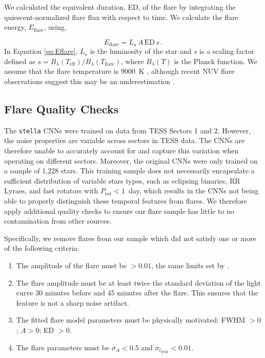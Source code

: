 \documentclass[twocolumn, linenumbers]{aastex631}
\begin{document}
We calculated the equivalent duration, ED, of the flare by integrating the quiescent-normalized flare flux with respect to time. We calculate the flare energy, $E_\textrm{flare}$, using,

\begin{equation}\label{eq:Eflare}
    E_\textrm{flare} = L_\star \, A \, \textrm{ED} \, s \, .
\end{equation}
In Equation \ref{eq:Eflare}, $L_\star$ is the luminosity of the star and $s$ is a scaling factor defined as $s = B_\lambda(T_\textrm{eff}) / B_\lambda(T_\textrm{flare})$, where $B_\lambda(T)$ is
the Planck function. We assume that the flare temperature is 9000~K \citep{hawley92, hawley95}, although recent NUV flare observations suggest this may be an underestimation
\citep{kowalski19, brasseur23, berger23}.

\subsection{Flare Quality Checks}\label{subsec2:qualitychecks}

The \texttt{stella} CNNs were trained on data from TESS Sectors 1 and 2. However, the noise properties are variable across sectors in TESS data. The CNNs are therefore unable to
accurately account for and capture  this variation when operating on different sectors. Moreover, the original CNNs were only trained on a sample of 1,228 stars. This training sample
does not necessarily encapsulate a sufficient distribution  of variable stars types, such as eclipsing binaries, RR Lyraes, and fast rotators with $P_\textrm{rot} < 1$~day, which
results in the CNNs not being able to properly distinguish these temporal features from flares. We therefore apply additional
quality checks to ensure our flare sample has little to no contamination from other sources.

Specifically, we remove flares from our sample which did not satisfy  one or more of the following criteria:
\begin{enumerate}
    \item  The amplitude of the flare must be $> 0.01$, the same limits set by \cite{feinstein20}.
    \item The flare amplitude  must be at least twice the standard deviation of the light curve 30 minutes before and 45 minutes after the flare. This ensures that the feature is not
    a sharp noise artifact.
    \item  The fitted flare model parameters must be physically motivated: FWHM $> 0$; $A > 0$; ED $> 0$.
    \item The flare parameters must be $\sigma_A < 0.5$ and $\sigma_{t_\textrm{peak}} < 0.01$.
\end{enumerate}
\end{document}
